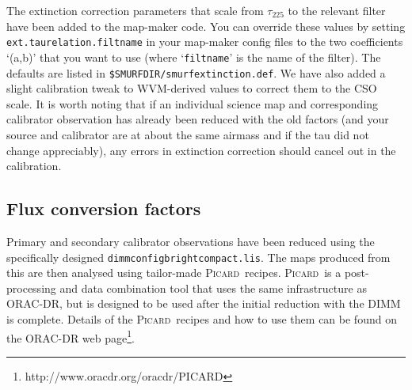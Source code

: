 \documentclass[twoside,11pt]{article}
\newcommand{\htmladdnormallinkfoot}[2]{#1\footnote{#2}}
\newcommand{\xref}[3]{#1}
\newcommand{\xlabel}[1]{}
\renewcommand{\_}{\texttt{\symbol{95}}}
\newcommand{\picard}{\xref{\textsc{Picard}}{sun231}{}}
\newcommand{\param}[1]{\texttt{#1}}
\begin{document}
The extinction correction parameters that scale from $\tau_{225}$ to
the relevant filter have been added to the map-maker code. You can
override these values by setting \param{ext.taurelation.filtname} in
your map-maker config files to the two coefficients `(a,b)' that you
want to use (where `\texttt{filtname}' is the name of the filter). The
defaults are listed in \texttt{\$SMURF\_DIR/smurf\_extinction.def}. We have
also added a slight calibration tweak to WVM-derived values to correct
them to the CSO scale. It is worth noting that if an individual
science map and corresponding calibrator observation has already been
reduced with the old factors (and your source and calibrator are at
about the same airmass and if the tau did not change appreciably), any
errors in extinction correction should cancel out in the calibration.


\subsection{\xlabel{fcf}Flux conversion factors}
\label{sec:fcf}

Primary and secondary calibrator observations have been reduced using
the specifically designed
\texttt{dimmconfig\_bright\_compact.lis}. The maps produced from this
are then analysed using tailor-made \picard\ recipes. \picard\ is a
post-processing and data combination tool that uses the same
infrastructure as ORAC-DR, but is designed to be used after the
initial reduction with the DIMM is complete. Details of the \picard\
recipes and how to use them can be found on \htmladdnormallinkfoot{the
  ORAC-DR web page}{http://www.oracdr.org/oracdr/PICARD}.
\end{document}
